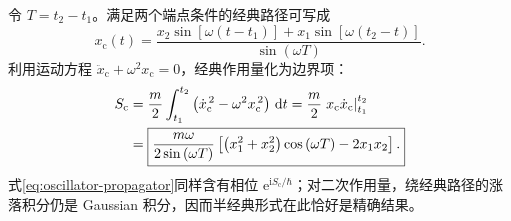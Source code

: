 \begin{example}[一维谐振子]
令 $T=t_2-t_1$。满足两个端点条件的经典路径可写成
\begin{equation}
x_{\mathrm c}\left(t\right)=
\frac{x_2\sin\left[\omega\left(t-t_1\right)\right]
+x_1\sin\left[\omega\left(t_2-t\right)\right]}
{\sin\left(\omega T\right)}.
\end{equation}
利用运动方程 $\ddot x_{\mathrm c}+\omega^2x_{\mathrm c}=0$，经典作用量化为边界项：
\begin{align}
S_{\mathrm c}
&=\frac{m}{2}\int_{t_1}^{t_2}
\left(\dot x_{\mathrm c}^{\,2}-\omega^2x_{\mathrm c}^{\,2}\right)\,\mathrm{d}t
=\frac{m}{2}\left.x_{\mathrm c}\dot x_{\mathrm c}\right|_{t_1}^{t_2}\notag\\
&=\boxed{\frac{m\omega}{2\sin\left(\omega T\right)}
\left[\left(x_1^2+x_2^2\right)\cos\left(\omega T\right)-2x_1x_2\right].}
\end{align}
式\eqref{eq:oscillator-propagator}同样含有相位 $\mathrm{e}^{\mathrm{i}S_{\mathrm c}/\hbar}$；对二次作用量，绕经典路径的涨落积分仍是 Gaussian 积分，因而半经典形式在此恰好是精确结果。
\end{example}
